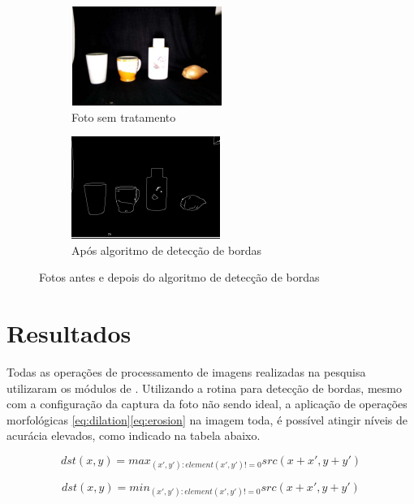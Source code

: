 \documentclass[10pt]{article}
\begin{document}
\begin{figure}[H]
    \centering
    \begin{subfigure}[b]{0.49\textwidth}
        \centering
        \includegraphics[scale=1.55]{images/input_image.png}
        \caption{Foto sem tratamento}
        \label{fig:celula_raw}
    \end{subfigure}
    \hfill
    \begin{subfigure}[b]{0.49\textwidth}
        \centering
        \includegraphics[scale=1.52]{images/output_image.png}
        \caption{Após algoritmo de detecção de bordas}
        \label{fig:detec_quinas}
    \end{subfigure}
    \caption{Fotos antes e depois do algoritmo de detecção de bordas}
    \label{fig:celulas}
\end{figure}

\section{Resultados}

Todas as operações de processamento de imagens realizadas na pesquisa utilizaram os módulos de \cite{opencv}. Utilizando a rotina para detecção de bordas, mesmo com a configuração da captura da foto não sendo ideal, a aplicação de operações morfológicas \ref{eq:dilation}\ref{eq:erosion} na imagem toda, é possível atingir níveis de acurácia elevados, como indicado na tabela abaixo.

\begin{equation}
    dst(x,y)=max_{(x',y'):element(x',y')!=0}src(x+x',y+y')
    \label{eq:dilation}
\end{equation}

\begin{equation}
    dst(x,y)=min_{(x',y'):element(x',y')!=0}src(x+x',y+y')
    \label{eq:erosion}
\end{equation}
\\
\end{document}
